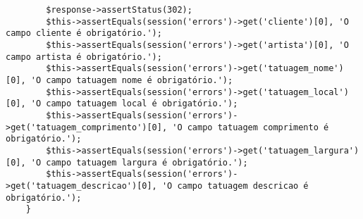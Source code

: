 \begin{lstlisting}
        $response->assertStatus(302);
        $this->assertEquals(session('errors')->get('cliente')[0], 'O campo cliente é obrigatório.');
        $this->assertEquals(session('errors')->get('artista')[0], 'O campo artista é obrigatório.');
        $this->assertEquals(session('errors')->get('tatuagem_nome')[0], 'O campo tatuagem nome é obrigatório.');
        $this->assertEquals(session('errors')->get('tatuagem_local')[0], 'O campo tatuagem local é obrigatório.');
        $this->assertEquals(session('errors')->get('tatuagem_comprimento')[0], 'O campo tatuagem comprimento é obrigatório.');
        $this->assertEquals(session('errors')->get('tatuagem_largura')[0], 'O campo tatuagem largura é obrigatório.');
        $this->assertEquals(session('errors')->get('tatuagem_descricao')[0], 'O campo tatuagem descricao é obrigatório.');
    }
    
\end{lstlisting}

